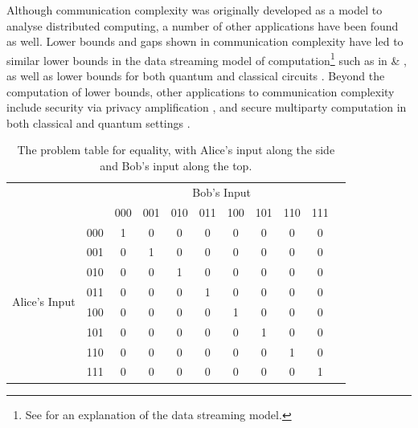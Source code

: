 \documentclass[a4paper]{article}
\begin{document}
        Although communication complexity was originally developed as a model to analyse distributed computing, a number of other applications have been found as well. Lower bounds and gaps shown in communication complexity have led to similar lower bounds in the data streaming model of computation\footnote{See \cite{TCS-002} for an explanation of the data streaming model.} such as in \cite{Gavinsky:2007:ESO:1250790.1250866} \& \cite{Verbin:2011:SCC:2133036.2133038}, as well as lower bounds for both quantum and classical circuits \cite{MSC:4265920, 366852}. Beyond the computation of lower bounds, other applications to communication complexity include security via privacy amplification \cite{Gavinsky:2007:ESO:1250790.1250866}, and secure multiparty computation in both classical and quantum settings \cite{Franklin:1992:CCS:129712.129780, Data2014, 1409.8488}.

        \begin{table}
            \begin{center}
                \begin{tabular}{|c|c|c|c|c|c|c|c|c|c|c|}
                    \hline
                    \multicolumn{2}{|c|}{}&\multicolumn{8}{|c|}{Bob's Input}\\\cline{3-10}
                    \multicolumn{2}{|c|}{}& 000 & 001 & 010 & 011 & 100 & 101 & 110 & 111\\\hline
                    \multirow{8}{*}{Alice's Input} & 000 & 1 & 0 & 0 & 0 & 0 & 0 & 0 & 0\\\cline{2-10}
                    & 001 & 0 & 1 & 0 & 0 & 0 & 0 & 0 & 0\\\cline{2-10}
                    & 010 & 0 & 0 & 1 & 0 & 0 & 0 & 0 & 0\\\cline{2-10}
                    & 011 & 0 & 0 & 0 & 1 & 0 & 0 & 0 & 0\\\cline{2-10}
                    & 100 & 0 & 0 & 0 & 0 & 1 & 0 & 0 & 0\\\cline{2-10}
                    & 101 & 0 & 0 & 0 & 0 & 0 & 1 & 0 & 0\\\cline{2-10}
                    & 110 & 0 & 0 & 0 & 0 & 0 & 0 & 1 & 0\\\cline{2-10}
                    & 111 & 0 & 0 & 0 & 0 & 0 & 0 & 0 & 1\\\hline
                \end{tabular}
            \end{center}
            \caption{The problem table for equality, with Alice's input along the side and Bob's input along the top.}
            \label{tab:eq}
        \end{table}
\end{document}
